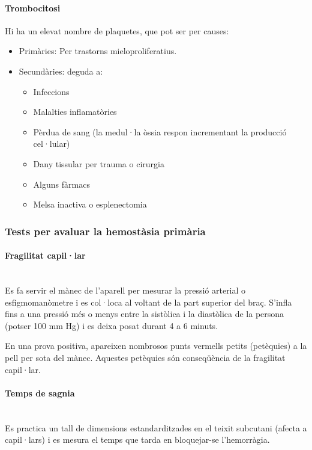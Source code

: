 \paragraph{Trombocitosi}
Hi ha un elevat nombre de plaquetes, que pot ser per causes:
\begin{itemize}
\item Primàries: Per trastorns mieloproliferatius.

\item Secundàries: deguda a:
  \begin{itemize}
  \item Infeccions
  \item Malalties inflamatòries
  \item Pèrdua de sang (la medul·la òssia respon incrementant la
    producció cel·lular)
  \item Dany tissular per trauma o cirurgia
  \item Alguns fàrmacs
  \item Melsa inactiva o esplenectomia
  \end{itemize}
\end{itemize}

\subsubsection{Tests per avaluar la hemostàsia primària}
\label{sec:tests-per-avaluar}

\paragraph{Fragilitat capil·lar} \hfill \\
Es fa servir el mànec de l'aparell per mesurar la pressió arterial o
esfigmomanòmetre i es col·loca al voltant de la part superior del
braç. S'infla fins a una pressió més o menys entre la sistòlica i la
diastòlica de la persona (potser 100 mm Hg) i es deixa posat durant 4
a 6 minuts.

En una prova positiva, apareixen nombrosos punts vermells petits
(petèquies) a la pell per sota del mànec. Aquestes petèquies són
conseqüència de la fragilitat capil·lar.

\paragraph{Temps de sagnia} \hfill \\
Es practica un tall de dimensions estandarditzades en el teixit
subcutani (afecta a capil·lars) i es mesura el temps que tarda en
bloquejar-se l’hemorràgia.

